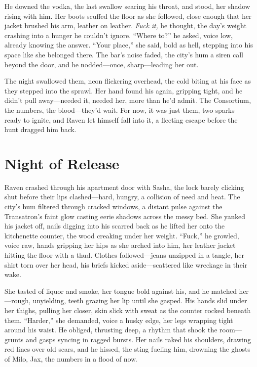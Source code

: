 \documentclass[12pt]{book}
\begin{document}
He downed the vodka, the last swallow searing his throat, and stood, her shadow rising with him. Her boots scuffed the floor as she followed, close enough that her jacket brushed his arm, leather on leather. \textit{Fuck it,} he thought, the day’s weight crashing into a hunger he couldn’t ignore. “Where to?” he asked, voice low, already knowing the answer. “Your place,” she said, bold as hell, stepping into his space like she belonged there. The bar’s noise faded, the city’s hum a siren call beyond the door, and he nodded—once, sharp—leading her out.

The night swallowed them, neon flickering overhead, the cold biting at his face as they stepped into the sprawl. Her hand found his again, gripping tight, and he didn’t pull away—needed it, needed her, more than he’d admit. The Consortium, the numbers, the blood—they’d wait. For now, it was just them, two sparks ready to ignite, and Raven let himself fall into it, a fleeting escape before the hunt dragged him back.

\section{Night of Release}

Raven crashed through his apartment door with Sasha, the lock barely clicking shut before their lips clashed—hard, hungry, a collision of need and heat. The city’s hum filtered through cracked windows, a distant pulse against the Transatron’s faint glow casting eerie shadows across the messy bed. She yanked his jacket off, nails digging into his scarred back as he lifted her onto the kitchenette counter, the wood creaking under her weight. “Fuck,” he growled, voice raw, hands gripping her hips as she arched into him, her leather jacket hitting the floor with a thud. Clothes followed—jeans unzipped in a tangle, her shirt torn over her head, his briefs kicked aside—scattered like wreckage in their wake.

She tasted of liquor and smoke, her tongue bold against his, and he matched her—rough, unyielding, teeth grazing her lip until she gasped. His hands slid under her thighs, pulling her closer, skin slick with sweat as the counter rocked beneath them. “Harder,” she demanded, voice a husky edge, her legs wrapping tight around his waist. He obliged, thrusting deep, a rhythm that shook the room—grunts and gasps syncing in ragged bursts. Her nails raked his shoulders, drawing red lines over old scars, and he hissed, the sting fueling him, drowning the ghosts of Milo, Jax, the numbers in a flood of now.
\end{document}

